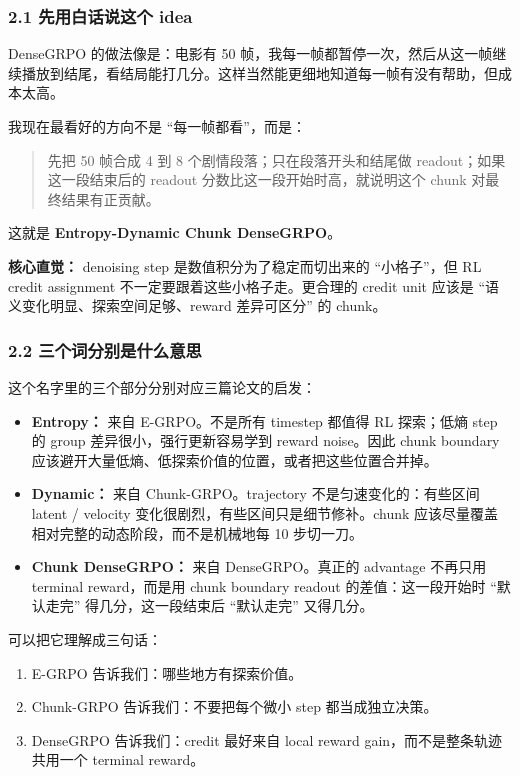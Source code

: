 \subsubsection{2.1 先用白话说这个 idea}

DenseGRPO 的做法像是：电影有 50 帧，我每一帧都暂停一次，然后从这一帧继续播放到结尾，看结局能打几分。这样当然能更细地知道每一帧有没有帮助，但成本太高。

我现在最看好的方向不是 ``每一帧都看''，而是：

\begin{quote}
先把 50 帧合成 4 到 8 个剧情段落；只在段落开头和结尾做 readout；如果这一段结束后的 readout 分数比这一段开始时高，就说明这个 chunk 对最终结果有正贡献。
\end{quote}

这就是 \textbf{Entropy-Dynamic Chunk DenseGRPO}。

\begin{summarybox}
\textbf{核心直觉：} denoising step 是数值积分为了稳定而切出来的 ``小格子''，但 RL credit assignment 不一定要跟着这些小格子走。更合理的 credit unit 应该是 ``语义变化明显、探索空间足够、reward 差异可区分'' 的 chunk。
\end{summarybox}

\subsubsection{2.2 三个词分别是什么意思}

这个名字里的三个部分分别对应三篇论文的启发：

\begin{itemize}[leftmargin=1.5em]
  \item \textbf{Entropy：} 来自 E-GRPO。不是所有 timestep 都值得 RL 探索；低熵 step 的 group 差异很小，强行更新容易学到 reward noise。因此 chunk boundary 应该避开大量低熵、低探索价值的位置，或者把这些位置合并掉。
  \item \textbf{Dynamic：} 来自 Chunk-GRPO。trajectory 不是匀速变化的：有些区间 latent / velocity 变化很剧烈，有些区间只是细节修补。chunk 应该尽量覆盖相对完整的动态阶段，而不是机械地每 10 步切一刀。
  \item \textbf{Chunk DenseGRPO：} 来自 DenseGRPO。真正的 advantage 不再只用 terminal reward，而是用 chunk boundary readout 的差值：这一段开始时 ``默认走完'' 得几分，这一段结束后 ``默认走完'' 又得几分。
\end{itemize}

可以把它理解成三句话：

\begin{enumerate}[leftmargin=1.5em]
  \item E-GRPO 告诉我们：哪些地方有探索价值。
  \item Chunk-GRPO 告诉我们：不要把每个微小 step 都当成独立决策。
  \item DenseGRPO 告诉我们：credit 最好来自 local reward gain，而不是整条轨迹共用一个 terminal reward。
\end{enumerate}

